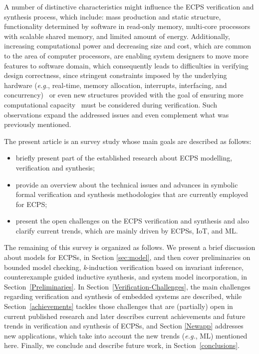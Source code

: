 \documentclass{cta-author}
\begin{document}
A number of distinctive characteristics might influence the ECPS verification and synthesis process, which include: mass production and static structure, functionality determined by software in read-only memory, multi-core processors with scalable shared memory, and limited amount of energy. Additionally, increasing computational power and decreasing size and cost, which are common to the area of computer processors, are enabling system designers to move more features to software domain, which consequently leads to difficulties in verifying design correctness, since stringent constraints imposed by the underlying hardware ({\it e.g.}, real-time, memory allocation, interrupts, interfacing, and concurrency)~\cite{Kroening15} or even new structures provided with the goal of ensuring more computational capacity~\cite{cudalucas} must be considered during verification. Such observations expand the addressed issues and even complement what was previously mentioned.

{\color{blue}
The present article is an survey study whose main goals are described as follows:
\begin{itemize}
	\item briefly present part of the established research about ECPS modelling, verification and synthesis;
	\item provide an overview about the technical issues and advances in symbolic formal verification and synthesis methodologies that are currently employed for ECPS;
	\item present the open challenges on the ECPS verification and synthesis and also clarify current trends, which are mainly driven by ECPSs, IoT, and ML. 
\end{itemize}

The remaining of this survey is organized as follows. We present a brief discussion about models for ECPSs, in Section \ref{sec:model}, and then cover preliminaries on bounded model checking, \textit{k}-induction verification based on invariant inference, counterexample guided inductive synthesis, and system model incorporation, in Section~\ref{Preliminaries}. In Section~\ref{Verification-Challenges}, the main challenges regarding verification and synthesis of embedded systems are described, while Section~\ref{achievements} tackles those challenges that are (partially) open in current published research and later describes current achievements and future trends in verification and synthesis of ECPSs, and Section \ref{Newapp} addresses new applications, which take into account the new trends ({\it e.g.}, ML) mentioned here. Finally, we conclude and describe future work, in Section~\ref{conclusions}.
}
\end{document}
